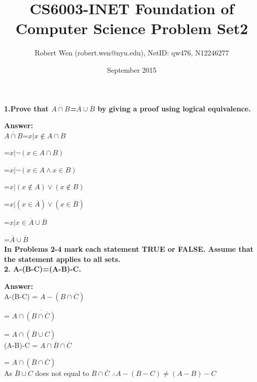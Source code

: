 \documentclass{article}
\title{CS6003-INET Foundation of Computer Science Problem Set2}
\author{Robert Wen (robert.wen@nyu.edu), NetID: qw476, N12246277}
\date{September 2015}
\begin{document}
\begin{large}

\maketitle



\textbf{1.Prove that \emph{$\overline{A\cap B}$=$\overline{A} \cup \overline{B}$} by giving a proof using logical equivalence.}

\textbf{Answer:} \\

\indent\indent\indent		     $\overline{A\cap B}$=${x|x \notin A\cap B}$

 \indent\indent \indent                  =${x|\lnot(x \in A\cap B)}$
                    
 \indent\indent \indent                  =${x|\lnot(x \in A \land x \in B)}$
                    
 \indent\indent \indent                  =${x|(x \notin A) \lor (x \notin B)}$
                    
  \indent\indent \indent                 =${x|(x \in \overline{A}) \lor (x \in \overline{B})}$
                    
 \indent\indent \indent                  =${x|x \in \overline{A} \cup \overline{B}}$
                    
 \indent\indent  \indent                 =$\overline{A} \cup \overline{B}$\\

\textbf{In Problems 2-4 mark each statement TRUE or FALSE. Assume that the statement applies to all sets.} \\

\textbf{2. A-(B-C)=(A-B)-C.}

\textbf{Answer:} \\

A-(B-C) = $A-(B \cap \overline{C})$

        = $A \cap \overline{(B \cap \overline{C})}$
        
        = $A \cap (\overline{B} \cup C)$\\

(A-B)-C = $A \cap \overline{B} \cap \overline{C}$

        = $A \cap (\overline{B} \cap \overline{C})$\\

As $\overline{B} \cup C$ does not equal to $\overline{B} \cap \overline{C}$
$\therefore A-(B-C) \neq (A-B)-C$\\


\end{large}
\end{document}
